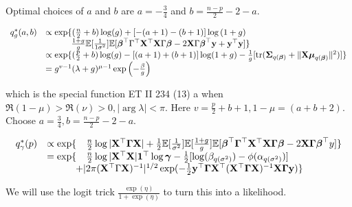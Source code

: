 \documentclass{amsart}[12pt]
\theoremstyle{definition}
\begin{document}
Optimal choices of $a$ and $b$ are $a = -\frac{3}{4}$ and $b=\frac{n-p}{2} - 2 - a$.

\begin{equation*}
	\begin{array}{rl}
		q^*_g(a, b) & \propto \exp \{(\frac{n}{2} + b) \log (g) + [-(a + 1) - (b + 1)] \log{(1 + g)}                                                                                 \\
		            & \qquad \quad \frac{1 + g}{g} \mathbb{E} [\frac{1}{1 \sigma^2}] \mathbb{E}[{\boldsymbol \beta}^\top \Gamma^\top {\bf X}^\top {\bf X} \Gamma {\boldsymbol\beta} - 2 {\bf X} \Gamma {\boldsymbol\beta}^\top {\bf y} + {\bf y}^\top {\bf y}] \} \\
		            & \propto \exp \{ (\frac{p}{2} + b) \log (g) - [(a + 1) + (b + 1)] \log (1 + g) - \frac{1}{g}[\text{tr}({\boldsymbol \Sigma}_{q({\boldsymbol \beta})} + \| {\bf X} {\boldsymbol \mu}_{q({\boldsymbol \beta})} \|^2)] \}        \\
		            & = g^{v-1} (\lambda + g)^{\mu - 1} \exp{\left (-\frac{\beta}{g}\right )}                                                                                        
	\end{array}
\end{equation*}

which is the special function ET II 234 (13) a when $\Re(1 - \mu) > \Re(\nu) > 0, | \arg \lambda | < \pi$. Here
$v = \frac{p}{2} + b + 1, 1 - \mu = (a + b + 2)$. Choose $a = \frac{3}{4}, b = \frac{n - p}{2} - 2 - a$.

\begin{equation*}
	\begin{array}{rl}
		q^*_\gamma (p) & \propto \exp \{ \quad \frac{n}{2} \log |{\bf X}^\top {\boldsymbol\Gamma} {\bf X}|                                                                                 
		+ \tfrac{1}{2} \mathbb{E}[\frac{1}{\sigma^2}] \mathbb{E}[\frac{1 + g}{g}] 
		\mathbb{E}[{\boldsymbol \beta}^\top {\boldsymbol\Gamma}^\top {\bf X}^\top {\bf X} {\boldsymbol\Gamma} {\boldsymbol\beta} - 2 {\bf X} {\boldsymbol \Gamma} {\boldsymbol \beta}^\top y]\} \\
		               & = \exp \{\quad \frac{n}{2} \log{|{\bf X}^\top {\bf X}|} {\bf1}^\top \log {\boldsymbol\gamma} - \tfrac{1}{2} [\log (\beta_{q(\sigma^2)}) - \phi(\alpha_{q(\sigma^2)})]     \\
		               & \qquad \quad + |2 \pi ({\bf X}^\top \Gamma {\bf X})^{-1}|^{1/2} \exp(-\tfrac{1}{2} {\bf y}^\top {\boldsymbol\Gamma} {\bf X}^\top ({\bf X}^\top {\boldsymbol\Gamma} {\bf X})^{-1} {\bf X} {\boldsymbol \Gamma} {\bf y}) \} 
	\end{array}
\end{equation*}

We will use the logit trick $\frac{\exp(\eta)}{1 + \exp(\eta)}$ to turn this into a likelihood.
\end{document}
